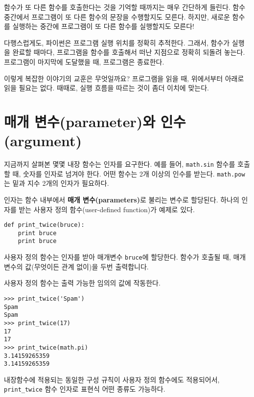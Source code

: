 함수가 또 다른 함수를 호출한다는 것을 기억할 때까지는 매우 간단하게 들린다.
함수 중간에서 프로그램이 또 다른 함수의 문장을 수행할지도 모른다. 
하지만, 새로운 함수를 실행하는 중간에 프로그램이 또 다른 함수를 실행할지도 모른다!

다행스럽게도, 파이썬은 프로그램 실행 위치를 정확히 추적한다. 
그래서, 함수가 실행을 완료할 때마다, 프로그램을 함수를 호출해서 떠난 지점으로 정확히 되돌려 놓는다. 
프로그램이 마지막에 도달했을 때, 프로그램은 종료한다.

이렇게 복잡한 이야기의 교훈은 무엇일까요? 
프로그램을 읽을 때, 위에서부터 아래로 읽을 필요는 없다. 
때때로, 실행 흐름을 따르는 것이 좀더 이치에 맞는다.

\section{매개 변수(parameter)와 인수(argument)}
\label{parameters}

지금까지 살펴본 몇몇 내장 함수는 인자를 요구한다. 
예를 들어, {\tt math.sin} 함수를 호출할 때, 숫자를 인자로 넘겨야 한다.
어떤 함수는 2개 이상의 인수를 받는다. {\tt math.pow} 는 밑과 지수 2개의 인자가 필요하다. 

인자는 함수 내부에서 {\bf 매개 변수(parameters)}로 불리는 변수로 할당된다.
하나의 인자를 받는 사용자 정의 함수(user-defined function)가 예제로 있다.


\beforeverb
\begin{verbatim}
def print_twice(bruce):
    print bruce
    print bruce
\end{verbatim}
\afterverb
%

사용자 정의 함수는 인자를 받아 매개변수 {\tt bruce}에 할당한다. 
함수가 호출될 때, 매개변수의 값(무엇이든 관계 없이)을 두번 출력합니다.

사용자 정의 함수는 출력 가능한 임의의 값에 작동한다.

\beforeverb
\begin{verbatim}
>>> print_twice('Spam')
Spam
Spam
>>> print_twice(17)
17
17
>>> print_twice(math.pi)
3.14159265359
3.14159265359
\end{verbatim}
\afterverb
%

내장함수에 적용되는 동일한 구성 규칙이 사용자 정의 함수에도 적용되어서, \verb"print_twice" 함수 인자로 표현식 어떤 종류도 가능하다. 

